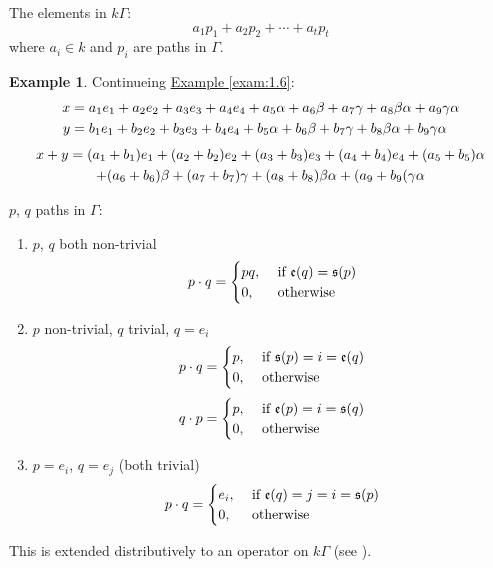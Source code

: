 \documentclass{amsart}
\numberwithin{equation}{section}
\theoremstyle{definition}
\newtheorem{exam}[thm]{Example}
\newcommand{\G}{\Gamma}
\begin{document}
The elements in $k\G$:
\[a_1p_1 + a_2p_2 + \cdots + a_tp_t\]
where $a_i\in k$ and $p_i$ are paths in $\G$.

\begin{exam}
Continueing \hyperref[exam:1.6]{Example \ref*{exam:1.6}}:
\begin{align}
x & = a_1e_1 + a_2e_2 + a_3e_3 + a_4e_4 + a_5\alpha + a_6\beta +
a_7\gamma + a_8\beta\alpha + a_9\gamma\alpha\notag\\
y & = b_1e_1 + b_2e_2 + b_3e_3 + b_4e_4 + b_5\alpha + b_6\beta +
b_7\gamma + b_8\beta\alpha + b_9\gamma\alpha\notag
\end{align}
\begin{multline}
x + y = (a_1 + b_1)e_1 + (a_2 + b_2)e_2 + (a_3 + b_3)e_3 + (a_4 +
b_4)e_4 + (a_5 + b_5)\alpha\notag\\ 
 + (a_6 + b_6)\beta + (a_7 + b_7)\gamma
+ (a_8 + b_8)\beta\alpha + (a_9 + b_9(\gamma\alpha\notag
\end{multline}
\end{exam}

$p$, $q$ paths in $\G$:
\begin{enumerate}[\rm(1)]
\item $p$, $q$ both non-trivial 
\[p\cdot q = \begin{cases} pq, & \text{\ if $\mathfrak{e}(q) =\mathfrak{s}(p)$}\notag\\
0, & \text{\ otherwise}\notag
\end{cases}\]
\item $p$ non-trivial, $q$ trivial, $q = e_i$
\[p\cdot q = \begin{cases} p, & \text{\ if $\mathfrak{s}(p) = i =\mathfrak{e}(q)$}\notag\\
0, & \text{\ otherwise}\notag
\end{cases}\]
\[q\cdot p = \begin{cases} p, & \text{\ if $\mathfrak{e}(p) = i = \mathfrak{s}(q)$}\notag\\
0, & \text{\ otherwise}\notag
\end{cases}\]
\item $p = e_i$, $q = e_j$ (both trivial)
\[p\cdot q = \begin{cases} e_i, & \text{\ if $\mathfrak{e}(q) = j = i
    = \mathfrak{s}(p)$}\notag\\
0, & \text{\ otherwise}\notag
\end{cases}\]
\end{enumerate}
 This is extended distributively to an operator on $k\G$ (see
 \cite[page 50]{ARS}). 
\end{document}
